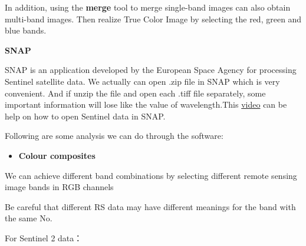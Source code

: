 \documentclass[
  letterpaper,
  DIV=11,
  numbers=noendperiod]{scrreprt}
\providecommand{\tightlist}{%
  \setlength{\itemsep}{0pt}\setlength{\parskip}{0pt}}\usepackage{longtable,booktabs,array}
\begin{document}
In addition, using the \textbf{merge} tool to merge single-band images
can also obtain multi-band images. Then realize True Color Image by
selecting the red, green and blue bands.

\textbf{SNAP}

SNAP is an application developed by the European Space Agency for
processing Sentinel satellite data. We actually can open .zip file in
SNAP which is very convenient. And if unzip the file and open each .tiff
file separately, some important information will lose like the value of
wavelength.This
\href{https://www.youtube.com/watch?v=vtlN5MXYGaY}{video} can be help on
how to open Sentinel data in SNAP.

Following are some analysis we can do through the software:

\begin{itemize}
\tightlist
\item
  \textbf{Colour composites}
\end{itemize}

We can achieve different band combinations by selecting different remote
sensing image bands in RGB channels

\begin{tcolorbox}[enhanced jigsaw, title=\textcolor{quarto-callout-tip-color}{\faLightbulb}\hspace{0.5em}{Tip}, coltitle=black, opacitybacktitle=0.6, toprule=.15mm, leftrule=.75mm, opacityback=0, arc=.35mm, breakable, colbacktitle=quarto-callout-tip-color!10!white, colback=white, bottomrule=.15mm, bottomtitle=1mm, toptitle=1mm, titlerule=0mm, rightrule=.15mm, left=2mm, colframe=quarto-callout-tip-color-frame]
Be careful that different RS data may have different meanings for the
band with the same No.~
\end{tcolorbox}

For Sentinel 2 data：
\end{document}
